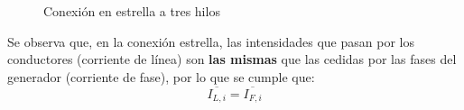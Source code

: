 \documentclass[11pt]{book} %
\numberwithin{dummy}{section}
\theoremstyle{ocrenumbox}
\theoremstyle{blacknumex}
\theoremstyle{blacknumbox}
\theoremstyle{ocrenum}
\begin{document}
	\begin{figure}[tbp]
		\centering
		\hfill
		\caption{Conexión en estrella a tres hilos}
		\label{fig.conexion_estrella_3}
	\end{figure}

	Se observa que, en la conexión estrella, las intensidades que pasan por los conductores (corriente de línea) son \textbf{las mismas} que las cedidas por las fases del generador (corriente de fase), por lo que se cumple que:
	\begin{equation}
	    \boxed{\overline{I_{L,i}}=\overline{I_{F,i}}}
	\end{equation}
	

	
	
\end{document}
